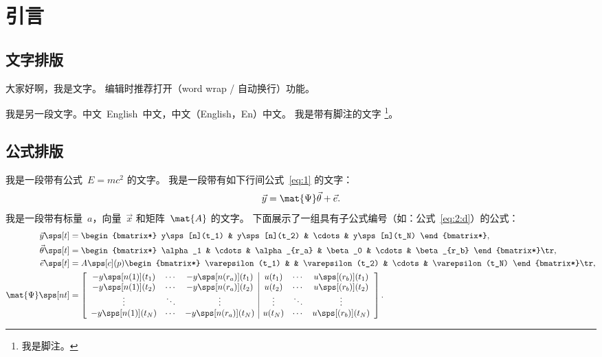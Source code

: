 \chapter{引言}
\label{chap:intro}

\section{文字排版}
\label{sec:intro:typesetting}
大家好啊，我是文字。
编辑时推荐打开（word wrap / 自动换行）功能。

我是另一段文字。中文~English~中文，中文（English，En）中文。
我是带有脚注的文字 \footnote{我是脚注。}。

\section{公式排版}
\label{sec:intro:formula}
我是一段带有公式~$E = mc^2$ 的文字。
我是一段带有如下行间公式~\ref{eq:1} 的文字：
\begin{equation} \label{eq:1}
    \vec{y} = \mat{\Psi} \vec{\theta} + \vec{e}.
\end{equation}
我是一段带有标量~$a$，向量~$\vec{x}$ 和矩阵~$\mat{A}$ 的文字。
下面展示了一组具有子公式编号（如：公式~\ref{eq:2:d}）的公式：
\begin{subequations} \begin{align}
    \vec{y}\sps[t] &= \begin{bmatrix*} y\sps[n](t_1) & y\sps[n](t_2) & \cdots & y\sps[n](t_N) \end{bmatrix*}, \\
    \vec{\theta}\sps[t] &= \begin{bmatrix*} \alpha_1 & \cdots & \alpha_{r_a} & \beta_0 & \cdots & \beta_{r_b} \end{bmatrix*}\tr, \\
    \vec{e}\sps[t] &= A\sps[c](p) \begin{bmatrix*} \varepsilon(t_1) & & \varepsilon(t_2) & \cdots & \varepsilon(t_N) \end{bmatrix*}\tr, \\
    \mat{\Psi}\sps[nt] &= \left[\begin{array}{ ccc | ccc }
        -y\sps[n(1)](t_1) & \cdots & -y\sps[n(r_a)](t_1) & u(t_1) & \cdots & u\sps[(r_b)](t_1) \\
        -y\sps[n(1)](t_2) & \cdots & -y\sps[n(r_a)](t_2) & u(t_2) & \cdots & u\sps[(r_b)](t_2) \\
        \vdots & \ddots & \vdots & \vdots & \ddots & \vdots \\
        -y\sps[n(1)](t_N) & \cdots & -y\sps[n(r_a)](t_N) & u(t_N) & \cdots & u\sps[(r_b)](t_N) \\
    \end{array}\right]. \label{eq:2:d}
\end{align} \end{subequations}
